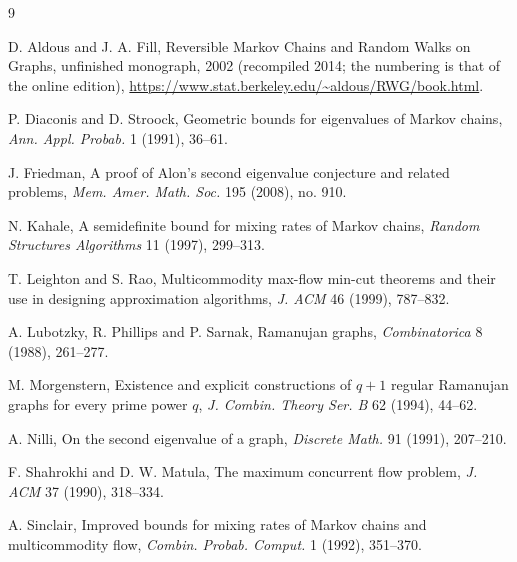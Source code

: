 \documentclass[11pt]{amsart}
\theoremstyle{definition}
\begin{document}
\begin{thebibliography}{9}

 D. Aldous and J. A. Fill, Reversible Markov Chains and Random Walks on Graphs, unfinished monograph, 2002 (recompiled 2014; the numbering is that of the online edition), \url{https://www.stat.berkeley.edu/~aldous/RWG/book.html}.

 P. Diaconis and D. Stroock, Geometric bounds for eigenvalues of Markov chains, \emph{Ann. Appl. Probab.} 1 (1991), 36--61.

 J. Friedman, A proof of Alon's second eigenvalue conjecture and related problems, \emph{Mem. Amer. Math. Soc.} 195 (2008), no. 910.

 N. Kahale, A semidefinite bound for mixing rates of Markov chains, \emph{Random Structures Algorithms} 11 (1997), 299--313.

 T. Leighton and S. Rao, Multicommodity max-flow min-cut theorems and their use in designing approximation algorithms, \emph{J. ACM} 46 (1999), 787--832.

 A. Lubotzky, R. Phillips and P. Sarnak, Ramanujan graphs, \emph{Combinatorica} 8 (1988), 261--277.

 M. Morgenstern, Existence and explicit constructions of $q+1$ regular Ramanujan graphs for every prime power $q$, \emph{J. Combin. Theory Ser. B} 62 (1994), 44--62.

 A. Nilli, On the second eigenvalue of a graph, \emph{Discrete Math.} 91 (1991), 207--210.

 F. Shahrokhi and D. W. Matula, The maximum concurrent flow problem, \emph{J. ACM} 37 (1990), 318--334.

 A. Sinclair, Improved bounds for mixing rates of Markov chains and multicommodity flow, \emph{Combin. Probab. Comput.} 1 (1992), 351--370.

\end{thebibliography}
\end{document}
